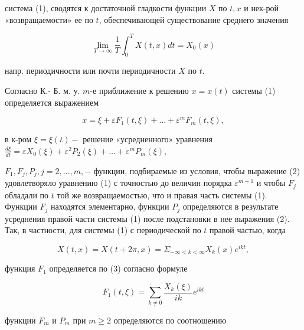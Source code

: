 \documentclass[10pt]{article}
\begin{document}
система (1), сводятся к достаточной гладкости функции $X$ по $t, x$ и нек-рой «возвращаемости» ее по $t$, обеспечивающей существование среднего значения



\[

\lim _{T \rightarrow \infty} \frac{1}{T} \int_{0}^{T} X(t, x) d t=X_{0}(x)

\]



напр. периодичности или почти периодичности $X$ по $t$.



Согласно К.- Б. м. у. $m$-е приближение к решению $x=x(t)$ системы (1) определяется выражением



\[

x=\xi+\varepsilon F_{1}(t, \xi)+\ldots+\varepsilon^{m} F_{m}(t, \xi),

\]



в к-ром $\xi=\xi(t)-$ решение «усредненного» уравнения $\frac{d \xi}{d t}=\varepsilon X_{0}(\xi)+\varepsilon^{2} P_{2}(\xi)+\ldots+\varepsilon^{m} P_{m}(\xi)$,



$F_{1}, F_{j}, P_{j}, j=2, \ldots, m,-$ функции, подбираемые из условия, чтобы выражение (2) удовлетворяло уравнению (1) с точностью до величин порядка $\varepsilon^{m+1}$ и чтобы $F_{j}$ обладали по $t$ той же возвращаемостью, что и правая часть системы (1). Функции $F_{j}$ находятся элементарно, функции $P_{j}$ определяются в результате усреднения правой части системы (1) после подстановки в нее выражения (2). Так, в частности, для системы (1) с периодической по $t$ правой частью, когда



\[

X(t, x)=X(t+2 \pi, x)=\Sigma_{-\infty<k<\infty} X_{k}(x) e^{i k t},

\]



функция $F_{1}$ определяется по (3) согласно формуле



\[

F_{1}(t, \xi)=\sum_{k \neq 0} \frac{X_{k}(\xi)}{i k} e^{i k t}

\]



функции $F_{m}$ и $P_{m}$ при $m \geqslant 2$ определяются по соотношению
\end{document}
